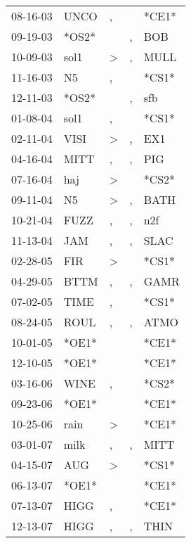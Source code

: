 \begin{supertabular}{lllll}
 08-16-03 &   UNCO &             , &               &  *CE1* \\
 09-19-03 &  *OS2* &               &             , &    BOB \\
 10-09-03 &   sol1 &  \textgreater &             , &   MULL \\
 11-16-03 &     N5 &             , &               &  *CS1* \\
 12-11-03 &  *OS2* &               &             , &    sfb \\
 01-08-04 &   sol1 &             , &               &  *CS1* \\
 02-11-04 &   VISI &  \textgreater &             , &    EX1 \\
 04-16-04 &   MITT &             , &             , &    PIG \\
 07-16-04 &    haj &  \textgreater &               &  *CS2* \\
 09-11-04 &     N5 &  \textgreater &             , &   BATH \\
 10-21-04 &   FUZZ &             , &             , &    n2f \\
 11-13-04 &    JAM &             , &             , &   SLAC \\
 02-28-05 &    FIR &  \textgreater &               &  *CS1* \\
 04-29-05 &   BTTM &             , &             , &   GAMR \\
 07-02-05 &   TIME &             , &               &  *CS1* \\
 08-24-05 &   ROUL &             , &             , &   ATMO \\
 10-01-05 &  *OE1* &               &               &  *CE1* \\
 12-10-05 &  *OE1* &               &               &  *CE1* \\
 03-16-06 &   WINE &             , &               &  *CS2* \\
 09-23-06 &  *OE1* &               &               &  *CE1* \\
 10-25-06 &   rain &  \textgreater &               &  *CE1* \\
 03-01-07 &   milk &             , &             , &   MITT \\
 04-15-07 &    AUG &  \textgreater &               &  *CS1* \\
 06-13-07 &  *OE1* &               &               &  *CE1* \\
 07-13-07 &   HIGG &             , &               &  *CE1* \\
 12-13-07 &   HIGG &             , &             , &   THIN \\

\end{supertabular}
